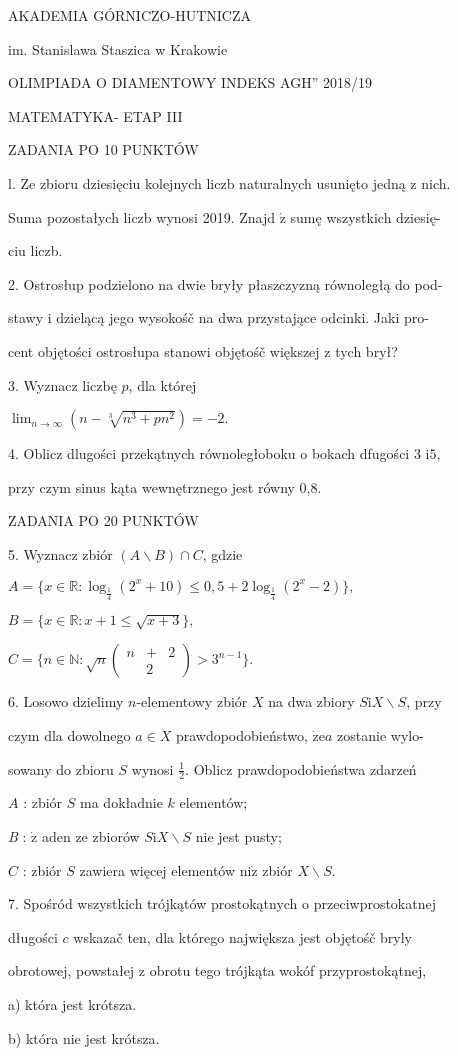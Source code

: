 \documentclass[a4paper,12pt]{article}
\begin{document}
AKADEMIA GÓRNICZO-HUTNICZA

im. Stanislawa Staszica w Krakowie

OLIMPIADA O DIAMENTOWY INDEKS AGH'' 2018/19

MATEMATYKA- ETAP III

ZADANIA PO 10 PUNKTÓW

l. Ze zbioru dziesięciu kolejnych liczb naturalnych usunięto jedną z nich.

Suma pozostałych liczb wynosi 2019. Znajd $\acute{\mathrm{z}}$ sumę wszystkich dziesię-

ciu liczb.

2. Ostrosłup podzielono na dwie bryły płaszczyzną równoległą do pod-

stawy i dzielącą jego wysokośč na dwa przystające odcinki. Jaki pro-

cent objętości ostrosłupa stanowi objętośč większej z tych brył?

3. Wyznacz liczbę $p$, dla której

$\displaystyle \lim_{n\rightarrow\infty}(n-\sqrt[3]{n^{3}+pn^{2}})=-2.$

4. Oblicz dlugości przekątnych równoległoboku o bokach dfugości 3 $\mathrm{i}5,$

przy czym sinus kąta wewnętrznego jest równy 0,8.

ZADANIA PO 20 PUNKTÓW

5. Wyznacz zbiór $(A\backslash B)\cap C$, gdzie

$A=\{x\in \mathbb{R}:\log_{\frac{1}{4}}(2^{x}+10)\leq 0,5+2\log_{\frac{1}{4}}(2^{x}-2)\},$

$B=\{x\in \mathbb{R}:x+1\leq\sqrt{x+3}\},$

$C=\{n\in \mathbb{N}:\sqrt{n}\left(\begin{array}{lll}
n & + & 2\\
 & 2 & 
\end{array}\right)>3^{n-1}\}.$

6. Losowo dzielimy $n$-elementowy zbiór $X$ na dwa zbiory $S\mathrm{i}X\backslash S$, przy

czym dla dowolnego $a\in X$ prawdopodobieństwo, $\dot{\mathrm{z}}\mathrm{e}a$ zostanie wylo-

sowany do zbioru $S$ wynosi $\displaystyle \frac{1}{2}$. Oblicz prawdopodobieństwa zdarzeń

$A$ : zbiór $S$ ma dokładnie $k$ elementów;

{\it B} : $\dot{\mathrm{z}}$ aden ze zbiorów $S\mathrm{i}X\backslash S$ nie jest pusty;

$C$ : zbiór $S$ zawiera więcej elementów $\mathrm{n}\mathrm{i}\dot{\mathrm{z}}$ zbiór $X\backslash S.$

7. Spośród wszystkich trójkątów prostokątnych o przeciwprostokatnej

długości $c$ wskazač ten, dla którego największa jest objętośč bryly

obrotowej, powstałej z obrotu tego trójkąta wokóf przyprostokątnej,

a) która jest krótsza.

b) która nie jest krótsza.
\end{document}

